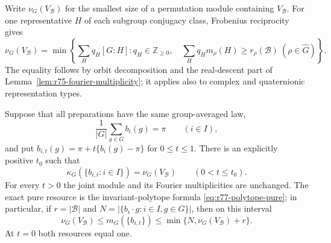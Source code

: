 Write $\nu_G(V_{\mathcal B})$ for the smallest size of a permutation
module containing $V_{\mathcal B}$.  For one representative $H$ of each
subgroup conjugacy class, Frobenius reciprocity gives
\begin{equation}\label{eq:r77-joint-module-cover}
 \nu_G(V_{\mathcal B})=
 \min\left\{\sum_Hq_H[G:H]:q_H\in\mathbb Z_{\ge0},\quad
       \sum_Hq_Hm_\rho(H)\ge r_\rho(\mathcal B)
                           \ (\rho\in\widehat G)\right\}.
\end{equation}
The equality follows by orbit decomposition and the real-descent part
of Lemma~\ref{lem:r75-fourier-multiplicity}; it applies also to complex
and quaternionic representation types.

\begin{theorem}
\label{thm:r77-shared-low-contrast}
Suppose that all preparations have the same group-averaged law,
\[
 \frac1{|G|}\sum_{g\in G}b_i(g)=\pi\qquad(i\in I),
\]
and put $b_{i,t}(g)=\pi+t\{b_i(g)-\pi\}$ for $0\le t\le1$.
There is an explicitly positive $t_0$ such that
\begin{equation}\label{eq:r77-shared-low-contrast}
 \kappa_G(\{b_{i,t}:i\in I\})
      =\nu_G(V_{\mathcal B})\qquad(0<t\le t_0).
\end{equation}
For every $t>0$ the joint module and its Fourier multiplicities are
unchanged.  The exact pure resource is the invariant-polytope formula
\eqref{eq:r77-polytope-pure}; in particular, if $r=|\mathcal B|$ and
$N=|\{b_i\cdot g:i\in I,g\in G\}|$, then on this interval
\[
 \nu_G(V_{\mathcal B})\le m_G(\{b_{i,t}\})
       \le\min\{N,\nu_G(V_{\mathcal B})+r\}.
\]
At $t=0$ both resources equal one.
\end{theorem}
